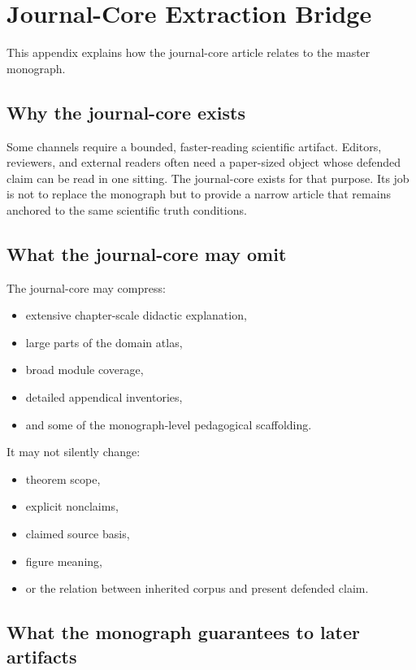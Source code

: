 \section{Journal-Core Extraction Bridge}
\label{sec:oc13-journal-core-bridge}

This appendix explains how the journal-core article relates to the master monograph.

\subsection{Why the journal-core exists}

Some channels require a bounded, faster-reading scientific artifact.
Editors, reviewers, and external readers often need a paper-sized object whose defended claim can
be read in one sitting.
The journal-core exists for that purpose.
Its job is not to replace the monograph but to provide a narrow article that remains anchored to
the same scientific truth conditions.

\subsection{What the journal-core may omit}

The journal-core may compress:

\begin{itemize}
\item extensive chapter-scale didactic explanation,
\item large parts of the domain atlas,
\item broad module coverage,
\item detailed appendical inventories,
\item and some of the monograph-level pedagogical scaffolding.
\end{itemize}

It may not silently change:

\begin{itemize}
\item theorem scope,
\item explicit nonclaims,
\item claimed source basis,
\item figure meaning,
\item or the relation between inherited corpus and present defended claim.
\end{itemize}

\subsection{What the monograph guarantees to later artifacts}

